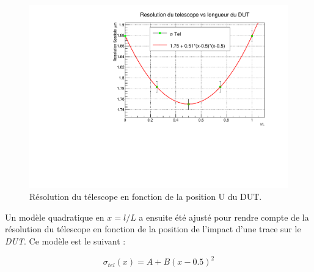   \begin{figure}[!Htb]
    \begin{center} 
     \includegraphics[scale=0.65]{./figures/Res_tel_tilt_DUT.pdf}
     \caption{R\'esolution du t\'elescope en fonction de la position U du DUT.}
    \label{fig:res_tel_vs_tilt}
    \end{center}
   \end{figure}
   
   \medskip
   
   Un mod\`ele quadratique en $x = l/L$ a ensuite \'et\'e ajust\'e pour rendre compte de la r\'esolution du t\'elescope en fonction de la position de l'impact d'une trace sur le \textit{DUT}. Ce mod\`ele est le suivant : 
   
   \begin{equation}
    \sigma_{tel}(x) = A + B (x-0.5)^2 
    \label{eq:modele}
   \end{equation}

